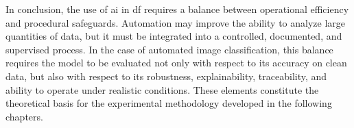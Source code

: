 In conclusion, the use of \gls{ai} in \gls{df} requires a balance between
operational efficiency and procedural safeguards. Automation may improve the
ability to analyze large quantities of data, but it must be integrated into a
controlled, documented, and supervised process. In the case of automated image
classification, this balance requires the model to be evaluated not only with
respect to its accuracy on clean data, but also with respect to its robustness,
explainability, traceability, and ability to operate under realistic
conditions. These elements constitute the theoretical basis for the
experimental methodology developed in the following chapters.
